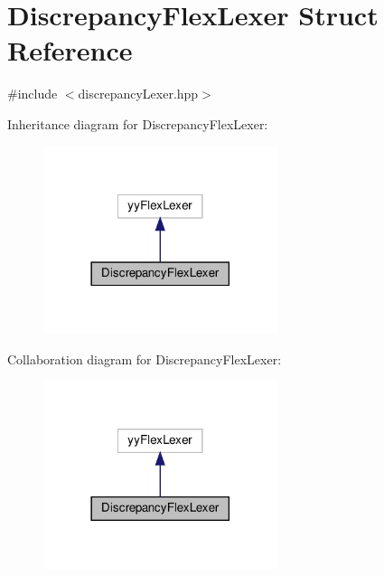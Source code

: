 \hypertarget{structDiscrepancyFlexLexer}{}\section{Discrepancy\+Flex\+Lexer Struct Reference}
\label{structDiscrepancyFlexLexer}


{\ttfamily \#include $<$discrepancy\+Lexer.\+hpp$>$}



Inheritance diagram for Discrepancy\+Flex\+Lexer\+:
\nopagebreak
\begin{figure}[H]
\begin{center}
\leavevmode
\includegraphics[width=194pt]{d0/d85/structDiscrepancyFlexLexer__inherit__graph}
\end{center}
\end{figure}


Collaboration diagram for Discrepancy\+Flex\+Lexer\+:
\nopagebreak
\begin{figure}[H]
\begin{center}
\leavevmode
\includegraphics[width=194pt]{d6/d42/structDiscrepancyFlexLexer__coll__graph}
\end{center}
\end{figure}
